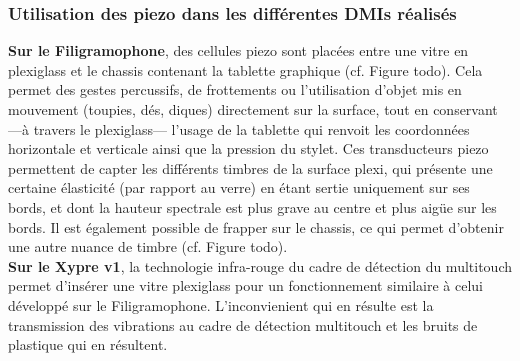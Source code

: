 \subsubsection{Utilisation des piezo dans les différentes DMIs réalisés}
\indent \textbf{Sur le Filigramophone}, des cellules piezo sont placées entre une vitre en plexiglass et le chassis contenant la tablette graphique (cf. Figure todo). Cela permet des gestes percussifs, de frottements ou l'utilisation d'objet mis en mouvement (toupies, dés, diques) directement sur la surface, tout en conservant —à travers le plexiglass— l'usage de la tablette qui renvoit les coordonnées horizontale et verticale ainsi que la pression du stylet. Ces transducteurs piezo permettent de capter les différents timbres de la surface plexi, qui présente une certaine élasticité (par rapport au verre) en étant sertie uniquement sur ses bords, et dont la hauteur spectrale est plus grave au centre et plus aigüe sur les bords. Il est également possible de frapper sur le chassis, ce qui permet d'obtenir une autre nuance de timbre (cf. Figure todo).\\
\indent \textbf{Sur le Xypre v1}, la technologie infra-rouge du cadre de détection du multitouch permet d'insérer une vitre plexiglass pour un fonctionnement similaire à celui développé sur le Filigramophone. L'inconvienient qui en résulte est la transmission des vibrations au cadre de détection multitouch et les bruits de plastique qui en résultent.\\
